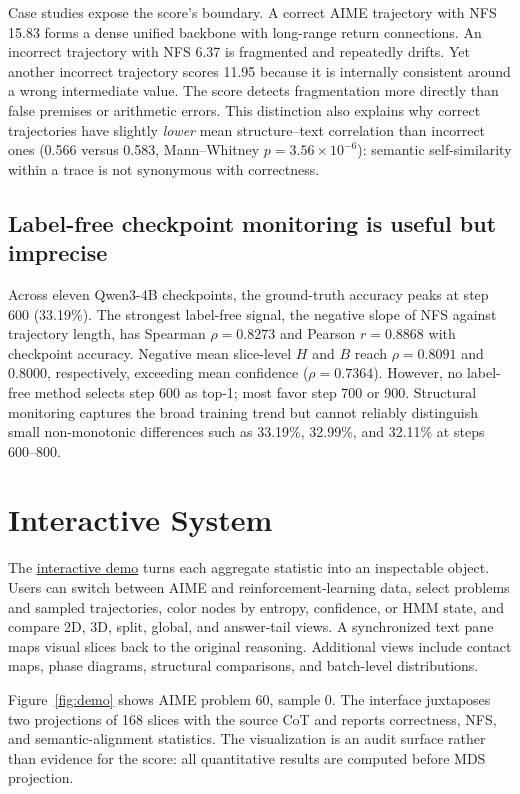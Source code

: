 \documentclass{article}
\newcommand{\nfs}{\textsc{NFS}}
\newcommand{\demo}{\href{http://demo.cot-folding.top}{interactive demo}}
\begin{document}
Case studies expose the score's boundary. A correct AIME trajectory with \nfs{} 15.83 forms a dense unified backbone with long-range return connections. An incorrect trajectory with \nfs{} 6.37 is fragmented and repeatedly drifts. Yet another incorrect trajectory scores 11.95 because it is internally consistent around a wrong intermediate value. The score detects fragmentation more directly than false premises or arithmetic errors. This distinction also explains why correct trajectories have slightly \emph{lower} mean structure--text correlation than incorrect ones (0.566 versus 0.583, Mann--Whitney $p=3.56\times10^{-6}$): semantic self-similarity within a trace is not synonymous with correctness.

\subsection{Label-free checkpoint monitoring is useful but imprecise}

Across eleven Qwen3-4B checkpoints, the ground-truth accuracy peaks at step 600 (33.19\%). The strongest label-free signal, the negative slope of \nfs{} against trajectory length, has Spearman $\rho=0.8273$ and Pearson $r=0.8868$ with checkpoint accuracy. Negative mean slice-level $H$ and $B$ reach $\rho=0.8091$ and $0.8000$, respectively, exceeding mean confidence ($\rho=0.7364$). However, no label-free method selects step 600 as top-1; most favor step 700 or 900. Structural monitoring captures the broad training trend but cannot reliably distinguish small non-monotonic differences such as 33.19\%, 32.99\%, and 32.11\% at steps 600--800.

\section{Interactive System}

The \demo{} turns each aggregate statistic into an inspectable object. Users can switch between AIME and reinforcement-learning data, select problems and sampled trajectories, color nodes by entropy, confidence, or HMM state, and compare 2D, 3D, split, global, and answer-tail views. A synchronized text pane maps visual slices back to the original reasoning. Additional views include contact maps, phase diagrams, structural comparisons, and batch-level distributions.

Figure~\ref{fig:demo} shows AIME problem 60, sample 0. The interface juxtaposes two projections of 168 slices with the source CoT and reports correctness, \nfs, and semantic-alignment statistics. The visualization is an audit surface rather than evidence for the score: all quantitative results are computed before MDS projection.
\end{document}

